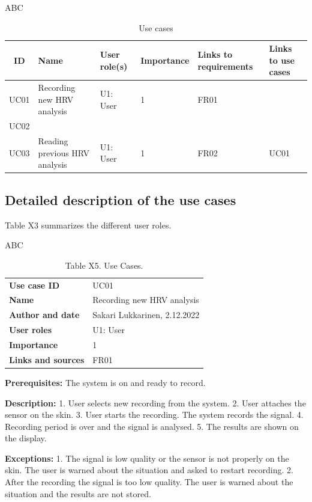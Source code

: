 \documentclass{article}
\begin{document}
ABC


\begin{table}[h]
\centering
\begin{tabular}{|c|p{3cm}|p{2cm}|p{2cm}|p{2cm}|p{2cm}|}
\hline
\textbf{ID} & \textbf{Name} & \textbf{User role(s)} & \textbf{Importance} & \textbf{Links to requirements} & \textbf{Links to use cases} \\
\hline
UC01 & Recording new HRV analysis & U1: User & 1 & FR01 & \\
\hline
UC02 & & & & & \\
\hline
UC03 & Reading previous HRV analysis & U1: User & 1 & FR02 & UC01 \\
\hline
\end{tabular}
\caption{Use cases}
\label{tab:my_label}
\end{table}


\subsection{Detailed description of the use cases}
Table X3 summarizes the different user roles.


ABC



\begin{table}[h]
\caption{Table X5. Use Cases.}
\label{table:X5}
\begin{tabular}{|l|l|}
\hline
\textbf{Use case ID} & UC01 \\
\textbf{Name} & Recording new HRV analysis \\
\textbf{Author and date} & Sakari Lukkarinen, 2.12.2022 \\
\textbf{User roles} & U1: User \\
\textbf{Importance} & 1 \\
\textbf{Links and sources} & FR01 \\
\hline
\end{tabular}
\end{table}

\textbf{Prerequisites:} The system is on and ready to record.

\textbf{Description:}
1. User selects new recording from the system.
2. User attaches the sensor on the skin.
3. User starts the recording. The system records the signal.
4. Recording period is over and the signal is analysed.
5. The results are shown on the display.

\textbf{Exceptions:}
1. The signal is low quality or the sensor is not properly on the skin. The user is warned about the situation and asked to restart recording.
2. After the recording the signal is too low quality. The user is warned about the situation and the results are not stored.
\end{document}
